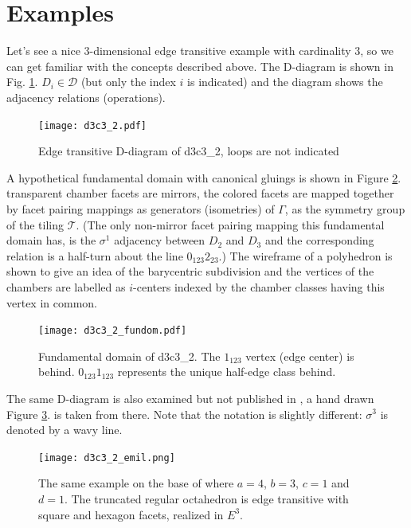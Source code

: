 \documentclass[12pt,a4paper]{article}
\numberwithin{equation}{section}
\theoremstyle{plain}%
\theoremstyle{definition}
\theoremstyle{remark}
\begin{document}
\section{Examples}

Let's see a nice $3$-dimensional edge transitive example with cardinality $3$,
so we can get familiar with the concepts described above. The D-diagram is shown
in Fig.  \ref{fig:d3c3_2}. $D_i\in \mathcal{D}$ (but only the index $i$ is
indicated) and the diagram shows the adjacency relations (operations).

\begin{figure}
  \caption{\label{fig:d3c3_2} Edge transitive D-diagram of d3c3\_2, loops are not indicated}
  \center
  \texttt{[image: d3c3\_2.pdf]}
\end{figure}

A hypothetical fundamental domain with canonical gluings is shown in Figure \ref{fig:d3c3_2_fundom}.
transparent chamber facets are mirrors, the colored facets are mapped together
by facet pairing mappings as generators (isometries) of $\Gamma$, as the
symmetry group of the tiling $\mathcal{T}$. (The only non-mirror facet pairing
mapping this fundamental domain has, is the $\sigma^1$ adjacency between $D_2$
and $D_3$ and the corresponding relation is a half-turn about the line
$0_{123}2_{23}$.) The wireframe of a polyhedron is shown to give an idea of the
barycentric subdivision and the vertices of the chambers are labelled as
$i$-centers indexed by the chamber classes having this vertex in common.

\begin{figure}
  \caption{\label{fig:d3c3_2_fundom} Fundamental domain of d3c3\_2. The
  $1_{123}$ vertex (edge center) is behind. $0_{123}1_{123}$ represents the
  unique half-edge class behind.}
  \center
  \texttt{[image: d3c3\_2\_fundom.pdf]}
\end{figure}

The same D-diagram is also examined but not published in \cite{DHM93}, a hand drawn Figure
\ref{fig:d3c3_2_emil}. is taken from there. Note that the notation is slightly
different: $\sigma^3$ is denoted by a wavy line.

\begin{figure}
  \caption{\label{fig:d3c3_2_emil} The same example on the base of
  \cite{DHM93} where $a=4$, $b=3$, $c=1$ and $d=1$. The truncated regular
  octahedron is edge transitive with square and hexagon facets, realized in
  $E^3$.}
  \center
  \texttt{[image: d3c3\_2\_emil.png]}
\end{figure}
\end{document}
